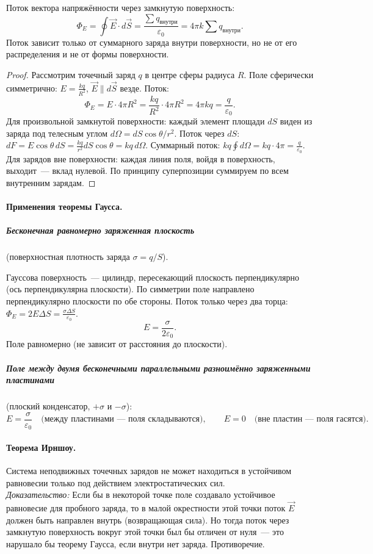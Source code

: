 \documentclass[12pt]{article}
\begin{document}
\begin{theorem}[Гаусса]
	Поток вектора напряжённости через замкнутую поверхность:
	\[
		\Phi_E = \oint \vec{E} \cdot d\vec{S} = \frac{\sum q_{\text{внутри}}}{\varepsilon_0} = 4\pi k \sum q_{\text{внутри}}.
	\]
	Поток зависит только от суммарного заряда внутри поверхности, но не от его распределения и не от формы поверхности.
\end{theorem}
\begin{proof}
	Рассмотрим точечный заряд $q$ в центре сферы радиуса $R$. Поле сферически симметрично: $E = \frac{kq}{R^2}$, $\vec{E} \parallel d\vec{S}$ везде. Поток:
	\[
		\Phi_E = E \cdot 4\pi R^2 = \frac{kq}{R^2}\cdot 4\pi R^2 = 4\pi k q = \frac{q}{\varepsilon_0}.
	\]
	Для произвольной замкнутой поверхности: каждый элемент площади $dS$ виден из заряда под телесным углом $d\Omega = dS\cos\theta/r^2$. Поток через $dS$: $dF = E\cos\theta\,dS = \frac{kq}{r^2}dS\cos\theta = kq\,d\Omega$. Суммарный поток: $kq\oint d\Omega = kq\cdot 4\pi = \frac{q}{\varepsilon_0}$. Для зарядов вне поверхности: каждая линия поля, войдя в поверхность, выходит~--- вклад нулевой. По принципу суперпозиции суммируем по всем внутренним зарядам.
\end{proof}

\paragraph{Применения теоремы Гаусса.}

\subparagraph{Бесконечная равномерно заряженная плоскость} (поверхностная плотность заряда $\sigma = q/S$).

Гауссова поверхность~--- цилиндр, пересекающий плоскость перпендикулярно (ось перпендикулярна плоскости). По симметрии поле направлено перпендикулярно плоскости по обе стороны. Поток только через два торца: $\Phi_E = 2E\Delta S = \frac{\sigma\Delta S}{\varepsilon_0}$.
\[
	\boxed{E = \frac{\sigma}{2\varepsilon_0}}.
\]
Поле равномерно (не зависит от расстояния до плоскости).

\subparagraph{Поле между двумя бесконечными параллельными разноимённо заряженными пластинами} (плоский конденсатор, $+\sigma$ и $-\sigma$):
\[
	E = \frac{\sigma}{\varepsilon_0} \quad \text{(между пластинами~--- поля складываются)}, \qquad E = 0 \quad \text{(вне пластин~--- поля гасятся)}.
\]

\paragraph{Теорема Ирншоу.}
Система неподвижных точечных зарядов не может находиться в устойчивом равновесии только под действием электростатических сил.\\
\textit{Доказательство:} Если бы в некоторой точке поле создавало устойчивое равновесие для пробного заряда, то в малой окрестности этой точки поток $\vec{E}$ должен быть направлен внутрь (возвращающая сила). Но тогда поток через замкнутую поверхность вокруг этой точки был бы отличен от нуля~--- это нарушало бы теорему Гаусса, если внутри нет заряда. Противоречие.
\end{document}
